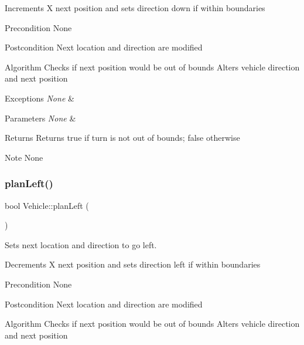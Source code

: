 Increments X next position and sets direction down if within boundaries

\begin{DoxyPrecond}{Precondition}
None
\end{DoxyPrecond}
\begin{DoxyPostcond}{Postcondition}
Next location and direction are modified
\end{DoxyPostcond}
\begin{DoxyParagraph}{Algorithm}
Checks if next position would be out of bounds Alters vehicle direction and next position
\end{DoxyParagraph}

\begin{DoxyExceptions}{Exceptions}
{\em None} & \\
\hline
\end{DoxyExceptions}

\begin{DoxyParams}{Parameters}
{\em None} & \\
\hline
\end{DoxyParams}
\begin{DoxyReturn}{Returns}
Returns true if turn is not out of bounds; false otherwise
\end{DoxyReturn}
\begin{DoxyNote}{Note}
None 
\end{DoxyNote}
\hypertarget{class_vehicle_ad3450983a521a908fe67e67e6457ff81}{}\label{class_vehicle_ad3450983a521a908fe67e67e6457ff81} 
\subsubsection{\texorpdfstring{plan\+Left()}{planLeft()}}
{\footnotesize\ttfamily bool Vehicle\+::plan\+Left (\begin{DoxyParamCaption}{ }\end{DoxyParamCaption})\hspace{0.3cm}{\ttfamily [protected]}}



Sets next location and direction to go left. 

Decrements X next position and sets direction left if within boundaries

\begin{DoxyPrecond}{Precondition}
None
\end{DoxyPrecond}
\begin{DoxyPostcond}{Postcondition}
Next location and direction are modified
\end{DoxyPostcond}
\begin{DoxyParagraph}{Algorithm}
Checks if next position would be out of bounds Alters vehicle direction and next position
\end{DoxyParagraph}

